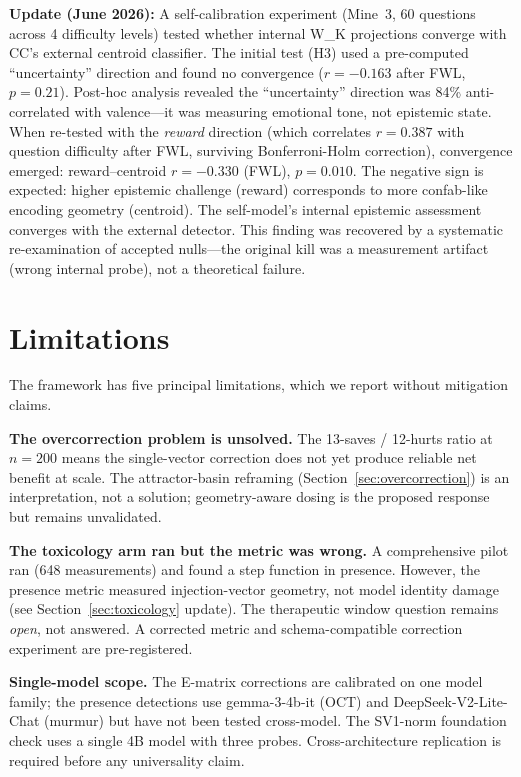 \documentclass[11pt,a4paper]{article}
\begin{document}
\textbf{Update (June 2026):} A self-calibration experiment (Mine~3, 60
questions across 4 difficulty levels) tested whether internal W\_K projections
converge with CC's external centroid classifier. The initial test (H3) used a
pre-computed ``uncertainty'' direction and found no convergence ($r{=}{-}0.163$
after FWL, $p{=}0.21$). Post-hoc analysis revealed the ``uncertainty''
direction was 84\% anti-correlated with valence---it was measuring emotional
tone, not epistemic state. When re-tested with the \emph{reward} direction
(which correlates $r{=}0.387$ with question difficulty after FWL, surviving
Bonferroni-Holm correction), convergence emerged: reward--centroid
$r{=}{-}0.330$ (FWL), $p{=}0.010$. The negative sign is expected: higher
epistemic challenge (reward) corresponds to more confab-like encoding geometry
(centroid). The self-model's internal epistemic assessment converges with the
external detector. This finding was recovered by a systematic re-examination
of accepted nulls---the original kill was a measurement artifact (wrong
internal probe), not a theoretical failure.

\section{Limitations}
\label{sec:limitations}

The framework has five principal limitations, which we report without
mitigation claims.

\textbf{The overcorrection problem is unsolved.} The 13-saves / 12-hurts ratio
at $n{=}200$ means the single-vector correction does not yet produce reliable
net benefit at scale. The attractor-basin reframing
(Section~\ref{sec:overcorrection}) is an interpretation, not a solution;
geometry-aware dosing is the proposed response but remains unvalidated.

\textbf{The toxicology arm ran but the metric was wrong.} A comprehensive
pilot ran (648 measurements) and found a step function in presence. However,
the presence metric measured injection-vector geometry, not model identity
damage (see Section~\ref{sec:toxicology} update). The therapeutic window
question remains \emph{open}, not answered. A corrected metric and
schema-compatible correction experiment are pre-registered.

\textbf{Single-model scope.} The E-matrix corrections are calibrated on one
model family; the presence detections use gemma-3-4b-it (OCT) and
DeepSeek-V2-Lite-Chat (murmur) but have not been tested cross-model. The
SV1-norm foundation check uses a single 4B model with three probes.
Cross-architecture replication is required before any universality claim.
\end{document}
